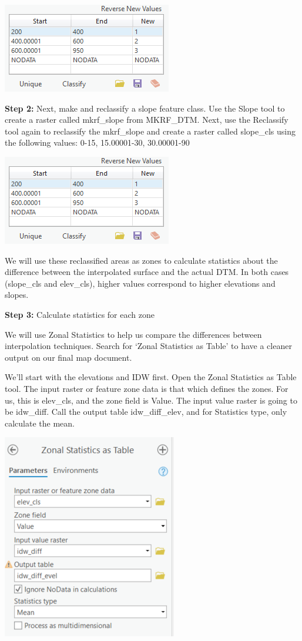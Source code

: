 \documentclass[
]{book}
\begin{document}
\begin{center}\includegraphics[width=0.4\linewidth]{images/04-reclassify-dtm} \end{center}

\textbf{Step 2:} Next, make and reclassify a slope feature class. Use the Slope tool to create a raster called mkrf\_slope from MKRF\_DTM. Next, use the Reclassify tool again to reclassify the mkrf\_slope and create a raster called slope\_cls using the following values: 0-15, 15.00001-30, 30.00001-90

\begin{center}\includegraphics[width=0.4\linewidth]{images/04-reclassify-dtm} \end{center}

We will use these reclassified areas as zones to calculate statistics about the difference between the interpolated surface and the actual DTM. In both cases (slope\_cls and elev\_cls), higher values correspond to higher elevations and slopes.

\textbf{Step 3:} Calculate statistics for each zone

We will use Zonal Statistics to help us compare the differences between interpolation techniques. Search for `Zonal Statistics as Table' to have a cleaner output on our final map document.

We'll start with the elevations and IDW first. Open the Zonal Statistics as Table tool. The input raster or feature zone data is that which defines the zones. For us, this is elev\_cls, and the zone field is Value. The input value raster is going to be idw\_diff. Call the output table idw\_diff\_elev, and for Statistics type, only calculate the mean.

\begin{center}\includegraphics[width=0.4\linewidth]{images/04-zonal-statistics} \end{center}
\end{document}
